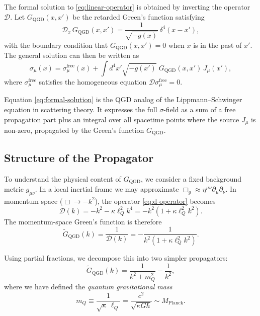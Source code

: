 \documentclass[11pt,a4paper]{article}
\theoremstyle{definition}
\theoremstyle{remark}
\begin{document}
	The formal solution to \eqref{eq:linear-operator} is obtained by inverting the operator $\mathcal{D}$. Let $G_{\text{QGD}}(x,x')$ be the retarded Green's function satisfying
	\begin{equation}
		\mathcal{D}_x \, G_{\text{QGD}}(x,x') = \frac{1}{\sqrt{-g(x)}} \, \delta^4(x-x'),
		\label{eq:green-eq}
	\end{equation}
	with the boundary condition that $G_{\text{QGD}}(x,x') = 0$ when $x$ is in the past of $x'$. The general solution can then be written as
	\begin{equation}
		\boxed{\;
			\sigma_\mu(x) = \sigma_\mu^{\text{free}}(x) + \int d^4x' \sqrt{-g(x')} \; G_{\text{QGD}}(x,x') \, J_\mu(x'),
			\;}
		\label{eq:formal-solution}
	\end{equation}
	where $\sigma_\mu^{\text{free}}$ satisfies the homogeneous equation $\mathcal{D} \sigma_\mu^{\text{free}} = 0$.
	
	Equation \eqref{eq:formal-solution} is the QGD analog of the Lippmann–Schwinger equation in scattering theory. It expresses the full $\sigma$-field as a sum of a free propagation part plus an integral over all spacetime points where the source $J_\mu$ is non-zero, propagated by the Green's function $G_{\text{QGD}}$.
	
	\subsection{Structure of the Propagator}
	
	To understand the physical content of $G_{\text{QGD}}$, we consider a fixed background metric $g_{\mu\nu}$. In a local inertial frame we may approximate $\Box_g \approx \eta^{\mu\nu}\partial_\mu\partial_\nu$. In momentum space ($\Box \to -k^2$), the operator \eqref{eq:d-operator} becomes
	\begin{equation}
		\mathcal{D}(k) = -k^2 - \kappa\ell_Q^2 k^4 = -k^2\left(1 + \kappa\ell_Q^2 k^2\right).
		\label{eq:d-momentum}
	\end{equation}
	The momentum-space Green's function is therefore
	\begin{equation}
		\widetilde{G}_{\text{QGD}}(k) = \frac{1}{\mathcal{D}(k)} 
		= -\frac{1}{k^2\left(1 + \kappa\ell_Q^2 k^2\right)}.
		\label{eq:green-momentum-raw}
	\end{equation}
	
	Using partial fractions, we decompose this into two simpler propagators:
	\begin{equation}
		\widetilde{G}_{\text{QGD}}(k) = \frac{1}{k^2 + m_Q^2} - \frac{1}{k^2},
		\label{eq:green-decomposed}
	\end{equation}
	where we have defined the \emph{quantum gravitational mass}
	\begin{equation}
		m_Q \equiv \frac{1}{\sqrt{\kappa}\,\ell_Q} = \frac{c^2}{\sqrt{\kappa G\hbar}} \sim M_{\text{Planck}}.
		\label{eq:quantum-mass}
	\end{equation}
	
\end{document}
